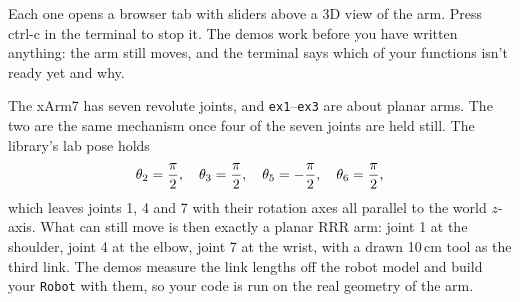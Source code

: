 \documentclass{16384_doc}
\begin{document}
Each one opens a browser tab with sliders above a 3D view of the arm. Press
ctrl-c in the terminal to stop it. The demos work before you have written
anything: the arm still moves, and the terminal says which of your functions
isn't ready yet and why.

The xArm7 has seven revolute joints, and \verb!ex1!--\verb!ex3! are about planar
arms. The two are the same mechanism once four of the seven joints are held
still. The library's lab pose holds
\[
    \theta_2 = \frac{\pi}{2}, \quad
    \theta_3 = \frac{\pi}{2}, \quad
    \theta_5 = -\frac{\pi}{2}, \quad
    \theta_6 = \frac{\pi}{2},
\]
which leaves joints 1, 4 and 7 with their rotation axes all parallel to the
world $z$-axis. What can still move is then exactly a planar RRR arm: joint 1 at
the shoulder, joint 4 at the elbow, joint 7 at the wrist, with a drawn 10\,cm
tool as the third link. The demos measure the link lengths off the robot model
and build your \verb!Robot! with them, so your code is run on the real geometry
of the arm.
\end{document}
